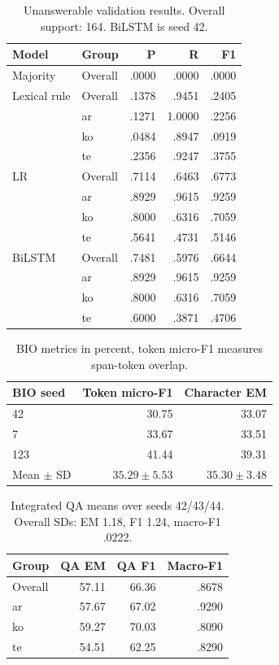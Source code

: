 \documentclass[11pt]{article}
\begin{document}
\begin{table}[H]
\centering\small\setlength{\tabcolsep}{4pt}
\begin{tabular}{llrrr}
\toprule
Model & Group & P & R & F1\\
\midrule
Majority & Overall & .0000 & .0000 & .0000\\
\midrule
Lexical rule & Overall & .1378 & .9451 & .2405\\
 & ar & .1271 & 1.0000 & .2256\\
 & ko & .0484 & .8947 & .0919\\
 & te & .2356 & .9247 & .3755\\
\midrule
LR & Overall & .7114 & .6463 & .6773\\
 & ar & .8929 & .9615 & .9259\\
 & ko & .8000 & .6316 & .7059\\
 & te & .5641 & .4731 & .5146\\
\midrule
BiLSTM & Overall & .7481 & .5976 & .6644\\
 & ar & .8929 & .9615 & .9259\\
 & ko & .8000 & .6316 & .7059\\
 & te & .6000 & .3871 & .4706\\
\bottomrule
\end{tabular}
\caption{Unanswerable validation results. Overall support: 164. BiLSTM is seed 42.}
\end{table}


\begin{table}[H]
\centering\small
\begin{tabular}{lrr}
\toprule
BIO seed & Token micro-F1 & Character EM\\
\midrule
42 & 30.75 & 33.07\\
7 & 33.67 & 33.51\\
123 & 41.44 & 39.31\\
Mean $\pm$ SD & $35.29\pm5.53$ & $35.30\pm3.48$\\
\bottomrule
\end{tabular}
\caption{BIO metrics in percent, token micro-F1 measures span-token overlap.}
\end{table}

\begin{table}[H]
\centering\small
\begin{tabular}{lrrr}
\toprule
Group & QA EM & QA F1 & Macro-F1\\
\midrule
Overall & 57.11 & 66.36 & .8678\\
ar & 57.67 & 67.02 & .9290\\
ko & 59.27 & 70.03 & .8090\\
te & 54.51 & 62.25 & .8290\\
\bottomrule
\end{tabular}
\caption{Integrated QA means over seeds 42/43/44. Overall SDs: EM 1.18, F1 1.24, macro-F1 .0222.}
\end{table}
\end{document}
